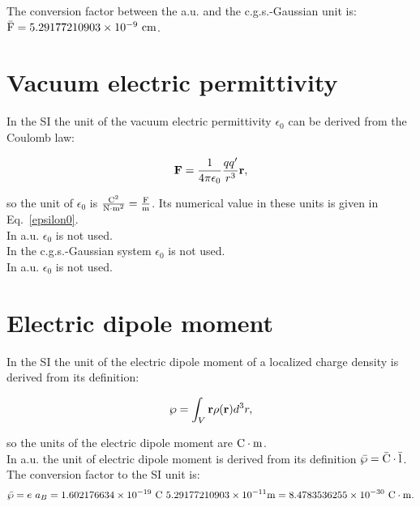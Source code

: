 \documentclass[12pt,a4paper,twoside]{report}
\def\e{1.602176634\times 10^{-19}}
\def\abohr{5.29177210903\times 10^{-11}}
\def\bardip{8.4783536255\times 10^{-30}}
\def\barcapcgs{5.29177210903\times 10^{-9}}
\begin{document}
{{\color{green} 
The conversion factor between the a.u. and the c.g.s.-Gaussian unit is: 
${\rm \bar F} = \barcapcgs \ {\rm cm}$.
}


\newpage
{\color{coral}\section{Vacuum electric permittivity}}
\color{black}
In the SI the unit of the vacuum electric permittivity $\epsilon_0$
can be derived from the Coulomb law:

\begin{tcolorbox}
\begin{equation}
{\bf F} = {1\over 4 \pi \epsilon_0} {qq'\over r^3} {\bf r},
\end{equation}
\end{tcolorbox}

so the unit of $\epsilon_0$ is ${{\rm C}^2 \over {\rm N}\cdot {\rm m}^2}={{\rm F}\over {\rm m}}$. 
Its numerical
value in these units is given in Eq.~\ref{epsilon0}.
\\

{\color{web-blue} In a.u. $\epsilon_0$ is not used.} 
\\

{\color{orange} In the c.g.s.-Gaussian system $\epsilon_0$ is not used.
}
\\

{\color{green} In a.u. $\epsilon_0$ is not used. 
\\
}

\newpage
{\color{coral}\section{Electric dipole moment}}
\color{black}
In the SI the unit of the electric dipole moment of a localized
charge density is derived from its definition:

\begin{tcolorbox}
\begin{equation}
{\bf \wp}=\int_V {\bf r} \rho({\bf r}) d^3r,
\end{equation}
\end{tcolorbox}

so the units of the electric dipole moment are ${\rm C}\cdot {\rm m}$.
\\

{\color{web-blue} In a.u. the unit of electric dipole moment is derived
from its definition ${\rm \bar \wp}={\rm \bar C}\cdot {\rm \bar l}$. The conversion factor to the
SI unit is:
\begin{equation}
{\rm \bar \wp} = e\ a_B = \e\ {\rm C}\ \abohr {\rm m} = \bardip\ {\rm C}\cdot {\rm m}.
\end{equation}
} 
\\

}
\end{document}
